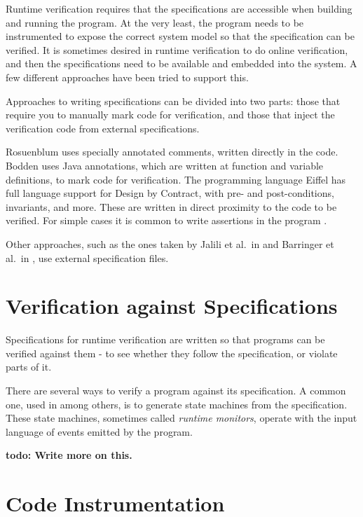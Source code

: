 \documentclass[a4paper,11pt]{kth-mag}
\newcommand{\todo}[1]{\textbf{todo: #1}}
\begin{document}
Runtime verification requires that the specifications are accessible when
building and running the program. At the very least, the program needs to be
instrumented to expose the correct system model so that the specification can
be verified. It is sometimes desired in runtime verification to do online
verification, and then the specifications need to be available and embedded
into the system. A few different approaches have been tried to support this.

Approaches to writing specifications can be divided into two parts: those that
require you to manually mark code for verification, and those that inject the
verification code from external specifications.

Rosuenblum \cite{rosenblum95practicalassertions} uses specially annotated
comments, written directly in the code. Bodden \cite{bodden05efficientrv} uses
Java annotations, which are written at function and variable definitions, to
mark code for verification. The programming language Eiffel has full language
support for Design by Contract, with pre- and post-conditions, invariants, and
more. These are written in direct proximity to the code to be verified. For
simple cases it is common to write assertions in the program
\cite{bartetzko01jass}.

Other approaches, such as the ones taken by Jalili et al.\ in
\cite{jalili07rverl} and Barringer et al.\ in \cite{barringer03eagle}, use
external specification files.



\section{Verification against Specifications} \label{section-verification}

Specifications for runtime verification are written so that programs can be
verified against them - to see whether they follow the specification, or
violate parts of it.

There are several ways to verify a program against its specification. A common
one, used in
\cite{bauer06monitoring,bodden05efficientrv,jalili07rverl,barringer03eagle}
among others, is to generate state machines from the specification. These state
machines, sometimes called \textit{runtime monitors}, operate with the input
language of events emitted by the program.

\todo{Write more on this.}


\section{Code Instrumentation} \label{section-instrumentation}
\end{document}
